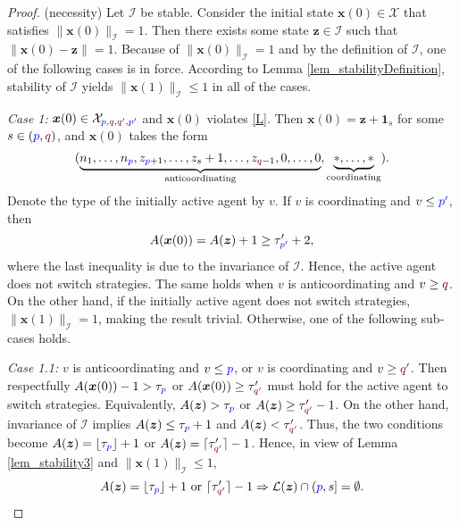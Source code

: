 \documentclass[10 pt,twocolumn,journal]{IEEEtran}
\DeclarePairedDelimiter{\ceil}{\lceil}{\rceil}
\DeclarePairedDelimiter{\floor}{\lfloor}{\rfloor}
\theoremstyle{plain}
\newcommand{\I}{\mathcal{I}}
\newcommand{\X}{\mathcal{X}}
\renewcommand{\L}{\mathcal{L}}
\newcommand{\x}{\bm{x}}
\newcommand{\z}{\bm{z}}
\newcommand{\p}{\tb{p}}
\newcommand{\pp}{\tb{p'}}
\newcommand{\q}{\tr{q}}
\newcommand{\qq}{\tr{q'}}
\newcommand{\tb}{\textcolor{blue}}
\newcommand{\tr}{\textcolor{Myred}}
\theoremstyle{definition}
\begin{document}
\begin{proof}
(necessity) 
Let $\I$ be stable. 
Consider the initial state $\x(0)\in\X$ that satisfies $\|\x(0)\|_{\I} = 1 $. 
Then there exists some state $\z\in\I$ such that $\|\x(0) - \z\| = 1$.
Because of $\|\x(0)\|_{\I} = 1 $ and by the definition of $\I$, one of the following cases is in force.
According to Lemma \ref{lem_stabilityDefinition}, stability of $\I$ yields $\|\x(1)\|_{\I}\leq 1$ in all of the cases.

\emph{Case 1:} $\x(0) \in \X_{\p,\q,\qq ,\pp }$ and $\x(0)$ violates \eqref{L}.
Then $\x(0)=\z+\bm{1}_s$ for some $s\in(\p,\q)$, and $\x(0)$ takes the form
\begin{equation*}\scalebox{1}{\text{$
    (\underbrace{n_1,\ldots,n_{\p},z_{\p+1},\ldots,z_s+1,\ldots,z_{\q-1}, 0,\ldots,0}_{\text{anticoordinating}}, 
    \underbrace{*, \ldots, *}_{\text{coordinating}})$}}.
\end{equation*}
Denote the type of the initially active agent by $v$.
If $v$ is coordinating and $v \leq \pp $, then
\begin{equation*}
    A(\x(0))
    =A(\z)+1
    \geq {\tau'_{\pp }}+2,
\end{equation*}
where the last inequality is due to the invariance of $\I$.
Hence, the active agent does not switch strategies.
The same holds when $v$ is anticoordinating and $v\geq \q$.
On the other hand, if the initially active agent does not switch strategies, $\|\x(1)\|_{\I}=1$, making the result trivial.
Otherwise, one of the following sub-cases holds.

\emph{Case 1.1:} $v$ is anticoordinating and $v\leq\p$, or $v$ is coordinating and $v\geq\qq$.
Then respectfully $A(\x(0))-1>\tau_{\p}$ or $A(\x(0))\geq\tau'_{\qq}$ must hold for the active agent to switch strategies. 
Equivalently, $A(\z)>\tau_{\p}$ or $A(\z)\geq\tau'_{\qq}-1$.
On the other hand, invariance of $\I$ implies $A(\z)\leq\tau_{\p}+1$ and $A(\z)<\tau'_{\qq}$.
Thus, the two conditions become $A(\z)=\floor{\tau_{\p}}+1$ or $A(\z)=\ceil{\tau'_{\qq}}-1$.
Hence, in view of Lemma \ref{lem_stability3} and $\|\x(1)\|_{\I}\leq1$,
\begin{equation} \label{stabilityTheorem_eq22}
    A(\z)=\floor{\tau_{\p}}+1 \text{ or }\ceil{\tau'_{\qq}}-1
    \Rightarrow
    \L(\z)\cap(\p,s] = \emptyset.
\end{equation}


\end{proof}
\end{document}
